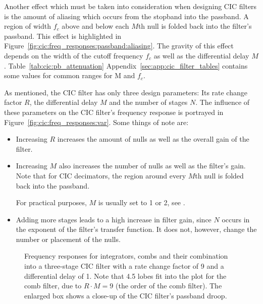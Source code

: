 Another  effect which  must be  taken  into consideration  when designing  CIC
filters  is  the amount  of  aliasing  which  occurs  from the  stopband  into
the  passband. A  region of  width  $f_c$  above  and  below each  $M$th  null
is  folded  back  into  the  filter's  passband. This  effect  is  highlighted
in  Figure~\ref{fig:cic:freq_responses:passband:aliasing}.    The  gravity  of
this  effect  depends   on  the  width  of  the  cutoff   frequency  $f_c$  as
well   as  the   differential  delay   $M$. Table~\ref{tab:cic:pb_attenuation}
Appendix~\ref{sec:app:cic_filter_tables}  contains  some   values  for  common
ranges for M and $f_c$.

As  mentioned, the  CIC filter  has  only three  design parameters: Its  rate
change factor  $R$, the differential delay  $M$ and the number  of stages $N$.
The influence  of these parameters  on the  CIC filter's frequency  response is
portrayed in Figure~\ref{fig:cic:freq_responses:var}. Some things of note are:
\begin{itemize}\tightlist
    \item
        Increasing $R$  increases the amount of  nulls as well as  the overall
        gain of the filter.
    \item
        Increasing  $M$ also  increases the  number of  nulls as  well as  the
        filter's gain.  Note that for  CIC decimators, the region around every
        $M$th null is folded back into the passband.

        For practical purposes, $M$ is usually  set to \num{1} or \num{2}, see
        \cite{1163535}.
    \item
        Adding more stages leads to a  high increase in filter gain, since $N$
        occurs in the exponent of the filter's transfer function. It does not,
        however, change the number or placement of the nulls.
\end{itemize}

\begin{figure}
    \centering
        
        \caption[Frequency Responses for Integrators, Combs and CIC Filters]{%
            Frequency responses  for integrators, combs and  their combination
            into a three-stage CIC filter with a rate change factor of \num{9}
            and a  differential delay of  \num{1}.  Note that  \num{4.5} lobes
            fit into the plot for the comb  filter, due to $R\cdot M = 9$ (the
            order of the  comb filter).  The enlarged box shows  a close-up of
            the CIC filter's passband droop.%
        }
        \label{fig:cic:freq_responses}
\end{figure}


